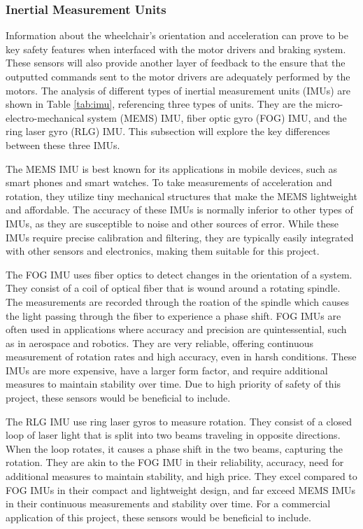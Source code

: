 \documentclass[conference]{IEEEtran}
\begin{document}
            \subsubsection{ {Inertial Measurement Units}}
            Information about the wheelchair's orientation and acceleration can prove to be key safety features when interfaced with the motor drivers and braking system. These sensors will also provide another layer of feedback to the ensure that the outputted commands sent to the motor drivers are adequately performed by the motors. The analysis of different types of inertial measurement units (IMUs) are shown in Table \ref{tab:imu}, referencing three types of units. They are the micro-electro-mechanical system (MEMS) IMU, fiber optic gyro (FOG) IMU, and the ring laser gyro (RLG) IMU. This subsection will explore the key differences between these three IMUs.

            The MEMS IMU is best known for its applications in mobile devices, such as smart phones and smart watches. To take measurements of acceleration and rotation, they utilize tiny mechanical structures that make the MEMS lightweight and affordable. The accuracy of these IMUs is normally inferior to other types of IMUs, as they are susceptible to noise and other sources of error. While these IMUs require precise calibration and filtering, they are typically easily integrated with other sensors and electronics, making them suitable for this project.

            The FOG IMU uses fiber optics to detect changes in the orientation of a system. They consist of a coil of optical fiber that is wound around a rotating spindle. The measurements are recorded through the roation of the spindle which causes the light passing through the fiber to experience a phase shift. FOG IMUs are often used in applications where accuracy and precision are quintessential, such as in aerospace and robotics. They are very reliable, offering continuous measurement of rotation rates and high accuracy, even in harsh conditions. These IMUs are more expensive, have a larger form factor, and require additional measures to maintain stability over time. Due to high priority of safety of this project, these sensors would be beneficial to include.

            The RLG IMU use ring laser gyros to measure rotation. They consist of a closed loop of laser light that is split into two beams traveling in opposite directions. When the loop rotates, it causes a phase shift in the two beams, capturing the rotation. They are akin to the FOG IMU in their reliability, accuracy, need for additional measures to maintain stability, and high price. They excel compared to FOG IMUs in their compact and lightweight design, and far exceed MEMS IMUs in their continuous measurements and stability over time. For a commercial application of this project, these sensors would be beneficial to include.  
\end{document}
